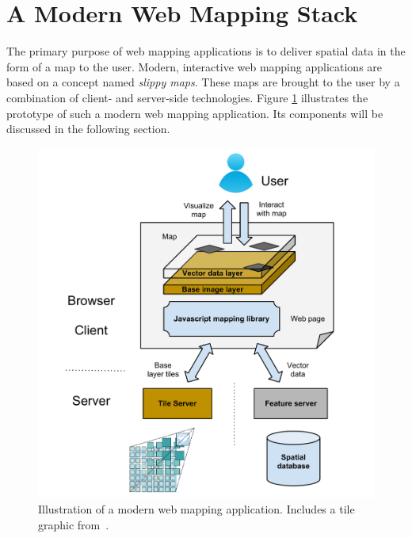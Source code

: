 
%
%

\section{A Modern Web Mapping Stack}

The primary purpose of web mapping applications is to deliver spatial data in the form of a map to the user. Modern, interactive web mapping applications are based on a concept named \textit{slippy maps}. These maps are brought to the user by a combination of client- and server-side technologies. Figure \ref{fig:web-mapping-stack} illustrates the prototype of such a modern web mapping application. Its components will be discussed in the following section.


\begin{figure}[h]
  \begin{center}
    \includegraphics[width=1\textwidth]{figures/web_mapping_stack.pdf}
    \caption{Illustration of a modern web mapping application. Includes a tile graphic from~\cite{web:cubeservtiles}.}
    \label{fig:web-mapping-stack}
  \end{center}
\end{figure}



